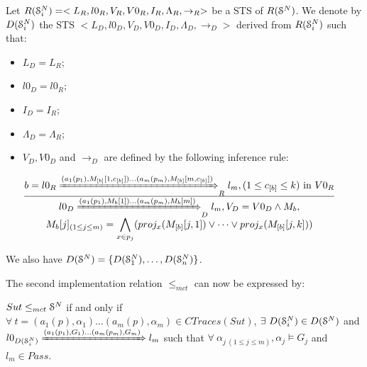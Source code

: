 \begin{definition}
    Let
    $R(\EuScript{S}_i^{N})=<L_R,l0_R,V_R,V0_R,I_R,\Lambda_R,\rightarrow_R>$
    be a STS of $R(\EuScript{S}^{N})$. We denote by
    $D(\EuScript{S}_i^{N})$ the STS $
    <L_D,l0_D,V_D,V0_D,I_D,\Lambda_D,\rightarrow_D>$ derived from
    $R(\EuScript{S}_i^{N})$ such that:

    \begin{itemize}
        \item $L_D=L_{R}$;

        \item $l0_D=l0_{R}$;

        \item $I_D=I_{R}$;

        \item $\Lambda_D=\Lambda_{R}$;

        \item $V_D, V0_D$ and $\rightarrow_D$ are defined by the
            following inference rule:

            $\frac{
                \begin{matrix}
                b=l0_{R}
                \xRightarrow{(a_1(p_1),M_{[b]}[1,c_{[b]}])\dots
                (a_m(p_m),M_{[b]}[m,c_{[b]}])}_{R}
                l_{m},
                (1 \leq c_{[b]} \leq k) \text{ in } V0_{R}
                \end{matrix}
            }
            {
                \begin{matrix}
                l0_D
                \xRightarrow{(a_1(p_1),M_{b}[1])\dots (a_m(p_m),M_{b}[m])}_{D}
                l_m, V_D=V0_D \wedge M_{b},\\
                M_{b}[j]_{(1\leq j \leq m)} = \displaystyle
                \bigwedge_{x \in p_j} ( proj_x(M_{[b]}[j, 1])
                \vee \dots \vee proj_x(M_{[b]}[j, k]))

                \end{matrix}
            }$
    \end{itemize}

    We also have $D(\EuScript{S}^{N}) =
    \{D(\EuScript{S}_1^{N}),\dots,D(\EuScript{S}_n^{N}) \}$.
\end{definition}

The second implementation relation $\leq_{mct}$ can now be
expressed by:

\begin{proposition}
    ${Sut} \leq_{mct} \EuScript{S}^{N}$ if and only if $\forall
    ~t= (a_1(p), \alpha_1) \dots (a_m(p), \alpha_m) \in CTraces({Sut})$,
    $\exists ~D(\EuScript{S}_i^{N}) \in D(\EuScript{S}^{N})$ and
    $l0_{D(\EuScript{S}_i^{N})} \xRightarrow{(a_1(p_1),G_{1})
    \dots (a_m(p_m),G_{m})} l_m$ such that $\forall
    ~\alpha_{j ~(1 \leq j \leq m)}, \alpha_j \models G_{j}$ and
    $l_m \in Pass$.
\end{proposition}


